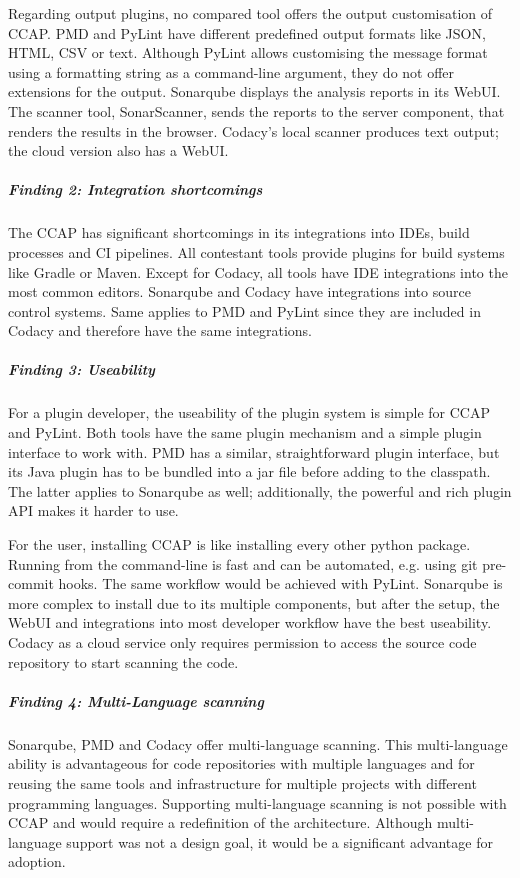 Regarding output plugins, no compared tool offers the output customisation of CCAP. PMD and PyLint have different predefined output formats like JSON, HTML, CSV or text. Although PyLint allows customising the message format using a formatting string as a command-line argument, they do not offer extensions for the output. Sonarqube displays the analysis reports in its WebUI. The scanner tool, SonarScanner, sends the reports to the server component, that renders the results in the browser.  Codacy's local scanner produces text output; the cloud version also has a WebUI.

\subparagraph{Finding 2: Integration shortcomings}
The CCAP has significant shortcomings in its integrations into IDEs, build processes and CI pipelines. All contestant tools provide plugins for build systems like Gradle or Maven. Except for Codacy, all tools have IDE integrations into the most common editors. Sonarqube and Codacy have integrations into source control systems. Same applies to PMD and PyLint since they are included in Codacy and therefore have the same integrations.

\subparagraph{Finding 3: Useability}
For a plugin developer, the useability of the plugin system is simple for CCAP and PyLint. Both tools have the same plugin mechanism and a simple plugin interface to work with. PMD has a similar, straightforward plugin interface, but its Java plugin has to be bundled into a jar file before adding to the classpath. The latter applies to Sonarqube as well; additionally, the powerful and rich plugin API makes it harder to use.

For the user, installing CCAP is like installing every other python package. Running from the command-line is fast and can be automated, e.g. using git pre-commit hooks. The same workflow would be achieved with PyLint. Sonarqube is more complex to install due to its multiple components, but after the setup, the WebUI and integrations into most developer workflow have the best useability. Codacy as a cloud service only requires permission to access the source code repository to start scanning the code.

\subparagraph{Finding 4: Multi-Language scanning}
Sonarqube, PMD and Codacy offer multi-language scanning. This multi-language ability is advantageous for code repositories with multiple languages and for reusing the same tools and infrastructure for multiple projects with different programming languages. Supporting multi-language scanning is not possible with CCAP and would require a redefinition of the architecture. Although multi-language support was not a design goal, it would be a significant advantage for adoption.

